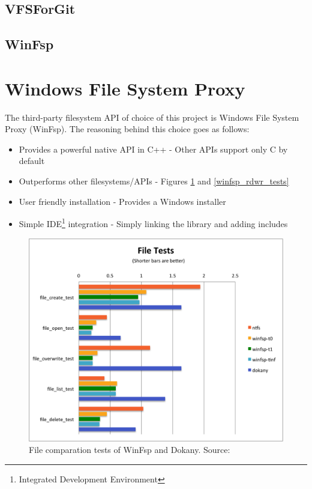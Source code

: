 \subsection*{VFSForGit}
\cite{GitVfsForGit}

\subsection*{WinFsp}
\cite{GitWinFsp}

\section{Windows File System Proxy}

The third-party filesystem API of choice of this project is Windows File System Proxy (WinFsp). The reasoning behind this choice goes as follows:

\begin{itemize}
    \item Provides a powerful native API in C++ - Other APIs support only C by default
    \item Outperforms other filesystems/APIs - Figures \ref{winfsp_file_tests} and \ref{winfsp_rdwr_tests}
    \item User friendly installation - Provides a Windows installer
    \item Simple IDE\footnote{Integrated Development Environment} integration - Simply linking the library and adding includes
\end{itemize}

\begin{figure}[htb]
	\centering
	\includegraphics[width=\columnwidth]{obrazky-figures/file_tests.pdf}
	\caption{File comparation tests of WinFsp and Dokany. Source:\cite{GitWinFsp}}
	\label{winfsp_file_tests}
\end{figure}

